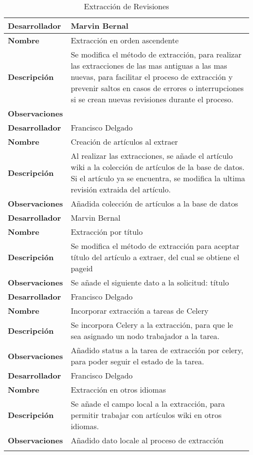 \begin{longtable}{|l|m{4in}|}
\hline
\hline
\textbf{Desarrollador} & Marvin Bernal \\
\hline
\textbf{Nombre} & Extracción en orden ascendente \\
\hline
\textbf{Descripción} & Se modifica el método de extracción, para realizar las extracciones de las mas antiguas a las mas nuevas, para facilitar el proceso de extracción y prevenir saltos en casos de errores o interrupciones si se crean nuevas revisiones durante el proceso. \\
\hline
\textbf{Observaciones} & \\

\hline
\hline
\textbf{Desarrollador} & Francisco Delgado \\
\hline
\textbf{Nombre} & Creación de artículos al extraer \\
\hline
\textbf{Descripción} & Al realizar las extracciones, se añade el artículo wiki a la colección de artículos de la base de datos. Si el artículo ya se encuentra, se modifica la ultima revisión extraida del artículo. \\
\hline
\textbf{Observaciones} & Añadida colección de artículos a la base de datos\\

\hline
\hline
\textbf{Desarrollador} & Marvin Bernal \\
\hline
\textbf{Nombre} & Extracción por título\\
\hline
\textbf{Descripción} & Se modifica el método de extracción para aceptar título del artículo a extraer, del cual se obtiene el pageid\\
\hline
\textbf{Observaciones} & Se añade el siguiente dato a la solicitud: título\\

\hline
\hline
\textbf{Desarrollador} & Francisco Delgado \\
\hline
\textbf{Nombre} & Incorporar extracción a tareas de Celery\\
\hline
\textbf{Descripción} & Se incorpora Celery a la extracción, para que le sea asignado un nodo trabajador a la tarea.\\
\hline
\textbf{Observaciones} & Añadido status a la tarea de extracción por celery, para poder seguir el estado de la tarea.\\


\hline
\hline
\textbf{Desarrollador} & Francisco Delgado \\
\hline
\textbf{Nombre} & Extracción en otros idiomas\\
\hline
\textbf{Descripción} & Se añade el campo local a la extracción, para permitir trabajar con artículos wiki en otros idiomas.\\
\hline
\textbf{Observaciones} & Añadido dato locale al proceso de extracción\\

\hline
\caption{Extracción de Revisiones}
\label{tab:extract}
\end{longtable}
	